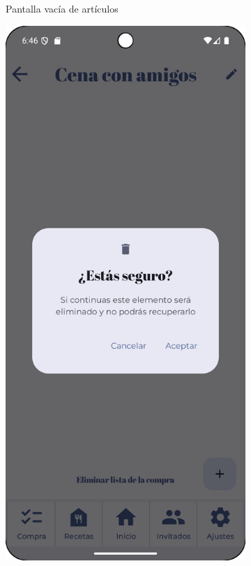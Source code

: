 \begin{figure}[H]
\begin{subfigure}[b]{0.3\textwidth}
      \caption{Pantalla vacía de artículos}
      \label{fig:no-items}
    \end{subfigure}
    \hfill
    \begin{subfigure}[b]{0.3\textwidth}
      \includegraphics[width=\textwidth]{./img/manual/delete_shopping_list_confirm.png}

\end{subfigure}
\end{figure}
